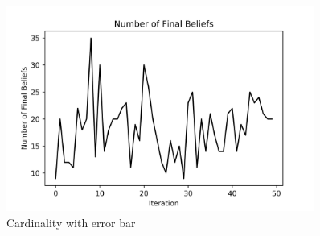 \documentclass[a4paper,12pt]{article}
\begin{document}
\begin{figure}[H]
	\centering
	\includegraphics[width=0.9\textwidth]{numbef50_4_1500_50_8}
	\caption{Cardinality with error bar}\label{numbef50_4_1500_50_8_mh}
\end{figure}
\end{document}
